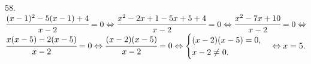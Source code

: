 58. $\cfrac{(x-1)^2-5(x-1)+4}{x-2}=0\Leftrightarrow \cfrac{x^2-2x+1-5x+5+4}{x-2}=0\Leftrightarrow \cfrac{x^2-7x+10}{x-2}=0
\Leftrightarrow$\\$ \cfrac{x(x-5)-2(x-5)}{x-2}=0\Leftrightarrow \cfrac{(x-2)(x-5)}{x-2}=0\Leftrightarrow \begin{cases}(x-2)(x-5)=0,\\ x-2\neq0.\end{cases}
\Leftrightarrow x=5.$\\
